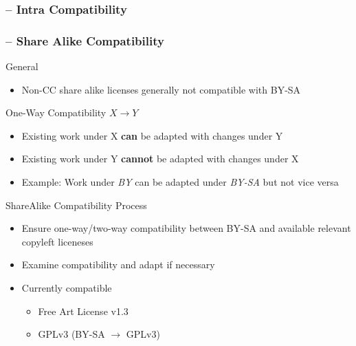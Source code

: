 \begin{frame}
	\frametitle{\insertsubsection{} -- Intra Compatibility}
	\centering{}
\end{frame}

\begin{frame}
	\frametitle{\insertsubsection{} -- Share Alike Compatibility}
	\begin{note}{General}
		\begin{itemize}
			\item Non-CC share alike licenses generally not compatible with BY-SA
		\end{itemize}
	\end{note}

	\begin{definition}{One-Way Compatibility $X \rightarrow Y$}
		\begin{itemize}
			\item Existing work under X \textbf{can} be adapted with changes under Y
			\item Existing work under Y \textbf{cannot} be adapted with changes under X
			\item Example: Work under \emph{BY} can be adapted under \emph{BY-SA} but not vice versa
		\end{itemize}
	\end{definition}

	\begin{definition}{ShareAlike Compatibility Process}
		\begin{itemize}
			\item Ensure one-way/two-way compatibility between BY-SA and available relevant copyleft liceneses
			\item Examine compatibility and adapt if necessary
			\item Currently compatible
			\begin{itemize}
				\item Free Art License v1.3
				\item GPLv3 (BY-SA $\rightarrow$ GPLv3)
			\end{itemize}
		\end{itemize}
	\end{definition}
	

\end{frame}